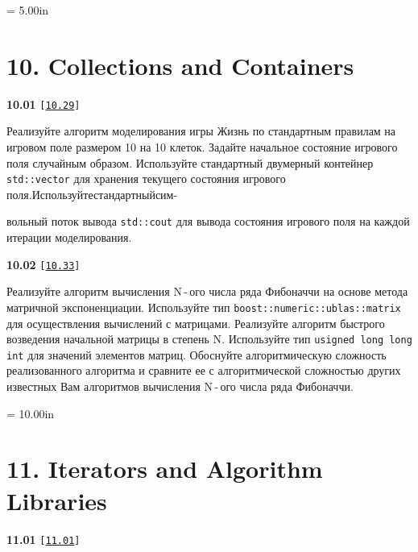 \documentclass[a4paper,12pt]{article}
\begin{document}
\newpage\thispagestyle{empty}\pdfpageheight = 5.00in\enlargethispage{100in}

\section{10. Collections and Containers}

{\large \textbf{10.01} \texttt{[\href{https://github.com/i-s-m-mipt/Education/blob/master/projects/examples/source/10.29.cpp}{\texttt{10.29}}]}}

\bigskip

Реализуйте алгоритм моделирования игры Жизнь по стандартным правилам на игровом поле размером 10 на 10 клеток. Задайте начальное состояние игрового поля случайным образом. Используйте стандартный двумерный контейнер \lstinline{std::vector} для хранения текущего состояния игрового поля.\:Используйте\:стандартный\:сим- 

вольный поток вывода \lstinline{std::cout} для вывода состояния игрового поля на каждой итерации моделирования.

\bigskip

{\large \textbf{10.02} \texttt{[\href{https://github.com/i-s-m-mipt/Education/blob/master/projects/examples/source/10.33.cpp}{\texttt{10.33}}]}}

\bigskip

Реализуйте алгоритм вычисления N\,-\,ого числа ряда Фибоначчи на основе метода матричной экспоненциации. Используйте тип \lstinline{boost::numeric::ublas::matrix} для осуществления вычислений с матрицами. Реализуйте алгоритм быстрого возведения начальной матрицы в степень N. Используйте тип \lstinline{usigned long long int} для значений элементов матриц. Обоснуйте алгоритмическую сложность реализованного алгоритма и сравните ее с алгоритмической сложностью других известных Вам алгоритмов вычисления N\,-\,ого числа ряда Фибоначчи.



\newpage\thispagestyle{empty}\pdfpageheight = 10.00in\enlargethispage{100in}

\section{11. Iterators and Algorithm Libraries}

{\large \textbf{11.01} \texttt{[\href{https://github.com/i-s-m-mipt/Education/blob/master/projects/examples/source/11.01.cpp}{\texttt{11.01}}]}}

\bigskip
\end{document}
